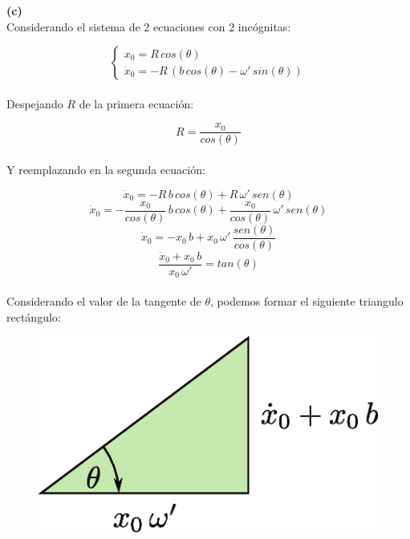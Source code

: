 \documentclass[letter,11pt]{article}
\begin{document}
\textbf{(c)} \\

Considerando el sistema de 2 ecuaciones con 2 incógnitas:

\begin{equation*}
    \begin{cases}
        x_0 = R\,cos(\theta) \\
        \dot{x}_0 = -R\,(b\,cos(\theta)-\omega'\,sin(\theta))
    \end{cases}
\end{equation*}
\\

Despejando $R$ de la primera ecuación:

\begin{equation*}
    R = \frac{x_0}{cos(\theta)}
\end{equation*}
\\

Y reemplazando en la segunda ecuación:

\begin{equation*}
    \dot{x}_0 = -R\,b\,cos (\theta) + R\,\omega'\,sen(\theta)
\end{equation*}
\begin{equation*}
    \dot{x}_0 = - \frac{x_0}{cos(\theta)}\,b\,cos (\theta) + \frac{x_0}{cos(\theta)}\,\omega'\,sen(\theta)
\end{equation*}
\begin{equation*}
    \dot{x}_0 = - x_0\,b + x_0\,\omega'\,\frac{sen(\theta)}{cos(\theta)}
\end{equation*}
\begin{equation*}
    \frac{\dot{x}_0 + x_0\,b}{x_0\,\omega'} = tan(\theta)
\end{equation*}
\\

Considerando el valor de la tangente de $\theta$, podemos formar el siguiente
triangulo rectángulo:

\begin{figure}[!h]
\centering
\includegraphics[scale=0.40]{resources/f1.eps}
\end{figure}
\end{document}
